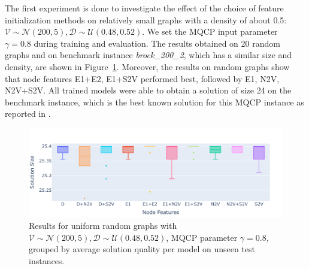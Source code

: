\documentclass[draft,final]{vutinfth} %
\begin{document}
The first experiment is done to investigate the effect of the choice of feature initialization methods on relatively small graphs with a density of about 0.5: $\mathcal{V} \sim \mathcal{N}(200, 5), \mathcal{D} \sim \mathcal{U}(0.48, 0.52)$. We set the MQCP input parameter $\gamma=0.8$ during training and evaluation. 
The results obtained on 20 random graphs and on benchmark instance \emph{brock\_200\_2}, which has a similar size and density, are shown in Figure~\ref{fig:V200-node-features}. 
Moreover, the results on random graphs show that node features E1+E2, E1+S2V performed best, followed by E1, N2V, N2V+S2V. 
All trained models were able to obtain a solution of size 24 on the benchmark instance, which is the best known solution for this MQCP instance as reported in \cite{peng_solving_2021}. 

\begin{figure}
    \centering
    \includegraphics[width=\textwidth]{graphics/V200-048-052-random.pdf}
    \caption[]{Results for uniform random graphs with $ \mathcal{V} \sim \mathcal{N}(200, 5), \mathcal{D} \sim \mathcal{U}(0.48, 0.52)$, MQCP parameter $\gamma=0.8$, grouped by average solution quality per model on unseen test instances. }
    \label{fig:V200-node-features}
\end{figure}
\end{document}

